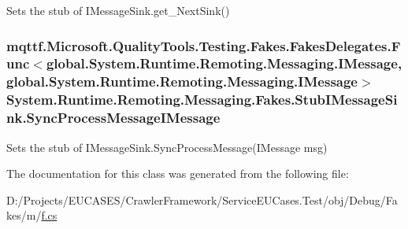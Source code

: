 Sets the stub of I\-Message\-Sink.\-get\-\_\-\-Next\-Sink()

\hypertarget{class_system_1_1_runtime_1_1_remoting_1_1_messaging_1_1_fakes_1_1_stub_i_message_sink_a414b6a0c64d0dabefe1cfc35471d8031}{
\subsubsection[{Sync\-Process\-Message\-I\-Message}]{\setlength{\rightskip}{0pt plus 5cm}mqttf.\-Microsoft.\-Quality\-Tools.\-Testing.\-Fakes.\-Fakes\-Delegates.\-Func$<$global.\-System.\-Runtime.\-Remoting.\-Messaging.\-I\-Message, global.\-System.\-Runtime.\-Remoting.\-Messaging.\-I\-Message$>$ System.\-Runtime.\-Remoting.\-Messaging.\-Fakes.\-Stub\-I\-Message\-Sink.\-Sync\-Process\-Message\-I\-Message}}\label{class_system_1_1_runtime_1_1_remoting_1_1_messaging_1_1_fakes_1_1_stub_i_message_sink_a414b6a0c64d0dabefe1cfc35471d8031}


Sets the stub of I\-Message\-Sink.\-Sync\-Process\-Message(\-I\-Message msg)



The documentation for this class was generated from the following file\-:\begin{DoxyCompactItemize}
\item 
D\-:/\-Projects/\-E\-U\-C\-A\-S\-E\-S/\-Crawler\-Framework/\-Service\-E\-U\-Cases.\-Test/obj/\-Debug/\-Fakes/m/\hyperlink{m_2f_8cs}{f.\-cs}\end{DoxyCompactItemize}
